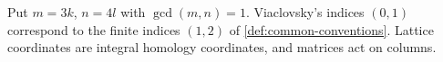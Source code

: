 \begin{definition}
\hypertarget{tag-IP10}{}\label{I:def:higher-multiplicity-coordinates}
Put $m=3k$, $n=4l$ with $\gcd(m,n)=1$.
Viaclovsky's indices $(0,1)$ correspond to the finite indices $(1,2)$
of \cref{def:common-conventions}. Lattice coordinates are integral
homology coordinates, and matrices act on columns.
\end{definition}
